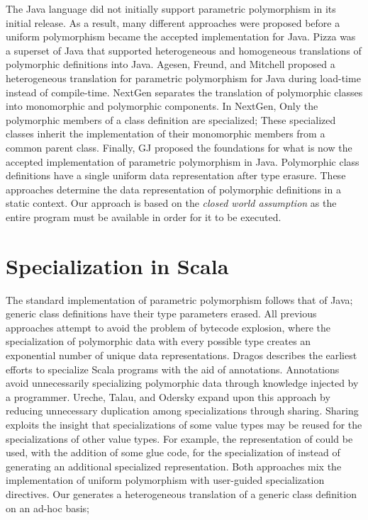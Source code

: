 The Java language did not initially support parametric polymorphism in its initial release.
As a result, many different approaches were proposed before a uniform polymorphism became the accepted implementation for Java.
Pizza\cite{java:pizza} was a superset of Java that supported heterogeneous and homogeneous translations of polymorphic definitions into Java.
Agesen, Freund, and Mitchell proposed a heterogeneous translation for parametric polymorphism for Java during load-time instead of compile-time\cite{java:agesen-type-params}.
NextGen\cite{java:nextgen} separates the translation of polymorphic classes into monomorphic and polymorphic components.
In NextGen, Only the polymorphic members of a class definition are specialized; These specialized classes inherit the implementation of their monomorphic members from a common parent class.
Finally, GJ\cite{java:gj} proposed the foundations for what is now the accepted implementation of parametric polymorphism in Java.
Polymorphic class definitions have a single uniform data representation after type erasure.
These approaches determine the data representation of polymorphic definitions in a static context.
Our approach is based on the \textit{closed world assumption} as the entire program must be available in order for it to be executed.

\section{Specialization in Scala}

The standard implementation of parametric polymorphism follows that of Java; generic class definitions have their type parameters erased.
All previous approaches attempt to avoid the problem of bytecode explosion, where the specialization of polymorphic data with every possible type creates an exponential number of unique data representations.
Dragos describes the earliest efforts to specialize Scala programs with the aid of annotations\cite{scala:specialization}.
Annotations avoid unnecessarily specializing polymorphic data through knowledge injected by a programmer.
Ureche, Talau, and Odersky expand upon this approach by reducing unnecessary duplication among specializations through sharing\cite{scala:miniboxing}.
Sharing exploits the insight that specializations of some value types may be reused for the specializations of other value types.
For example, the representation of  could be used, with the addition of some glue code, for the specialization of  instead of generating an additional specialized representation. 
Both approaches mix the implementation of uniform polymorphism with user-guided specialization directives.
Our generates a heterogeneous translation of a generic class definition on an ad-hoc basis;

